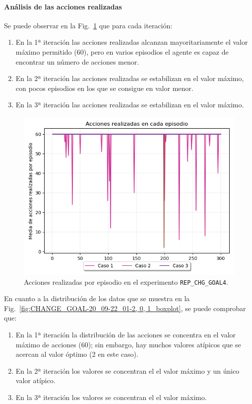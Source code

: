 \paragraph{Análisis de las acciones realizadas}

Se puede observar en la Fig.~\ref{fig:CHANGE_GOAL-20_09-22_01-2, 0, 1_acciones} que para cada iteración: 
\begin{enumerate}
    \item En la 1ª iteración las acciones realizadas alcanzan mayoritariamente el valor máximo permitido (60), pero en varios episodios el agente es capaz de encontrar un número de acciones menor. 
    \item En la 2ª iteración las acciones realizadas se estabilizan en el valor máximo, con pocos episodios en los que se consigue en valor menor. 
    \item En la 3ª iteración las acciones realizadas se estabilizan en el valor máximo.
\end{enumerate}

\begin{figure}
    \centering
    \includegraphics[scale=0.4]{cap5_experimentacion/images/CHANGE_GOAL-20_09-22_01-2, 0, 1_acciones.png}
    \caption{Acciones realizadas por episodio en el experimento \texttt{REP\_CHG\_GOAL4}.}
    \label{fig:CHANGE_GOAL-20_09-22_01-2, 0, 1_acciones}
\end{figure}

En cuanto a la distribución de los datos que se muestra en la Fig.~\ref{fig:CHANGE_GOAL-20_09-22_01-2, 0, 1_boxplot}, se puede comprobar que:
\begin{enumerate}
    \item En la 1ª iteración la distribución de las acciones se concentra en el valor máximo de acciones (60); sin embargo, hay muchos valores atípicos que se acercan al valor óptimo (2 en este caso).
    \item En la 2ª iteración los valores se concentran el el valor máximo y un único valor atípico. 
    \item En la 3ª iteración los valores se concentran el el valor máximo.
\end{enumerate}
 
